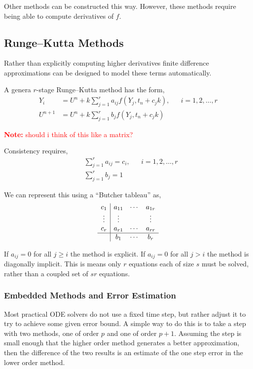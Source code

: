 \documentclass[12pt]{article}
\newcommand{\note}[1]{\textcolor{red}{\textbf{Note:} #1}}
\begin{document}
Other methods can be constructed this way. However, these methods require being able to compute derivatives of \( f \).


\subsection{Runge--Kutta Methods}
Rather than explicitly computing higher derivatives finite difference approximations can be designed to model these terms automatically.

\begin{definition}
A genera \( r \)-stage Runge--Kutta method has the form,
\begin{align*}
    Y_i &= U^n + k \sum_{j=1}^{r} a_{ij} f(Y_j, t_n + c_jk), && i=1,2,\ldots, r \\
    U^{n+1} &= U^n + k \sum_{j=1}^{r} b_j f(Y_j, t_n + c_j k)
\end{align*}
\end{definition}

\note{should i think of this like a matrix?}

Consistency requires,
\begin{align*}
    &\sum_{j=1}^{r} a_{ij} = c_i, && i=1,2,\ldots, r \\
    &\sum_{j=1}^{r} b_j = 1
\end{align*}

We can represent this using a ``Butcher tableau'' as,
\begin{align*}
    \begin{array}{c|ccc}
        c_1 & a_{11} & \cdots & a_{1r} \\
        \vdots & \vdots && \vdots \\
        c_r & a_{r1} & \cdots & a_{rr} \\ \hline
        & b_1 & \cdots & b_r
    \end{array}
\end{align*}

If \( a_{ij} = 0 \) for all \( j\geq i \) the method is explicit. If \( a_{ij} = 0 \) for all \( j > i \) the method is diagonally implicit. This is means only \( r \) equations each of size \( s \) must be solved, rather than a coupled set of \( sr \) equations.

\subsubsection{Embedded Methods and Error Estimation}
Most practical ODE solvers do not use a fixed time step, but rather adjust it to try to achieve some given error bound. A simple way to do this is to take a step with two methods, one of order \( p \) and one of order \( p+1 \). Assuming the step is small enough that the higher order method generates a better approximation, then the difference of the two results is an estimate of the one step error in the lower order method.
\end{document}
